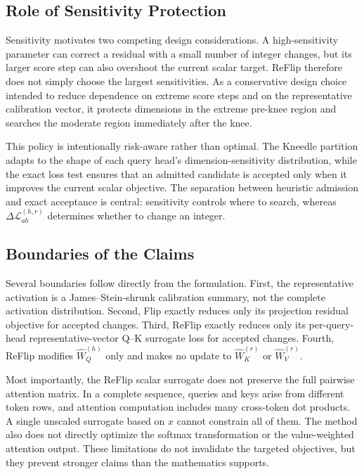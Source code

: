 \subsection{Role of Sensitivity Protection}

Sensitivity motivates two competing design considerations. A high-sensitivity parameter can correct a residual with a small number of integer changes, but its larger score step can also overshoot the current scalar target. ReFlip therefore does not simply choose the largest sensitivities. As a conservative design choice intended to reduce dependence on extreme score steps and on the representative calibration vector, it protects dimensions in the extreme pre-knee region and searches the moderate region immediately after the knee.

This policy is intentionally risk-aware rather than optimal. The Kneedle partition adapts to the shape of each query head's dimension-sensitivity distribution, while the exact loss test ensures that an admitted candidate is accepted only when it improves the current scalar objective. The separation between heuristic admission and exact acceptance is central: sensitivity controls where to search, whereas $\Delta\mathcal{L}^{(h,r)}_{ab}$ determines whether to change an integer.

\subsection{Boundaries of the Claims}

Several boundaries follow directly from the formulation. First, the representative activation is a James--Stein-shrunk calibration summary, not the complete activation distribution. Second, Flip exactly reduces only its projection residual objective for accepted changes. Third, ReFlip exactly reduces only its per-query-head representative-vector Q--K surrogate loss for accepted changes. Fourth, ReFlip modifies $\hat W_Q^{(h)}$ only and makes no update to $\hat W_K^{(r)}$ or $\hat W_V^{(r)}$.

Most importantly, the ReFlip scalar surrogate does not preserve the full pairwise attention matrix. In a complete sequence, queries and keys arise from different token rows, and attention computation includes many cross-token dot products. A single unscaled surrogate based on $x$ cannot constrain all of them. The method also does not directly optimize the softmax transformation or the value-weighted attention output. These limitations do not invalidate the targeted objectives, but they prevent stronger claims than the mathematics supports.

